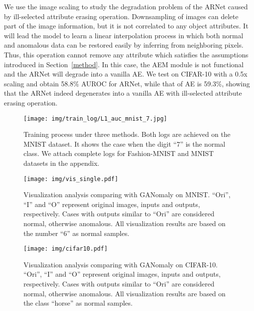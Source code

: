 \documentclass[journal]{IEEEtran}
\begin{document}
We use the image scaling to study the degradation problem of the ARNet caused by ill-selected attribute erasing operation. Downsampling of images can delete part of the image information, but it is not correlated to any object attributes. It will lead the model to learn a linear interpolation process in which both normal and anomalous data can be restored easily by inferring from neighboring pixels. Thus, this operation cannot remove any attribute which satisfies the assumptions introduced in Section~\ref{method}. In this case, the AEM module is not functional and the ARNet will degrade into a vanilla AE. We test on CIFAR-10 with a 0.5x scaling and obtain 58.8\% AUROC for ARNet, while that of AE is 59.3\%, showing that the ARNet indeed degenerates into a vanilla AE with ill-selected attribute erasing operation.

\begin{figure}[t]
\centering
\texttt{[image: img/train\_log/L1\_auc\_mnist\_7.jpg]}
\caption{Training process under three methods. Both logs are achieved on the MNIST dataset. It shows the case when the digit ``7'' is the normal class. We attach complete logs for Fashion-MNIST and MNIST datasets in the appendix.}
\label{fig:stable1}
\end{figure}

\begin{figure}[t]
\centering
\texttt{[image: img/vis\_single.pdf]}
\caption{Visualization analysis comparing with GANomaly on MNIST. ``Ori'', ``I'' and ``O'' represent original images, inputs and outputs, respectively. Cases with outputs similar to ``Ori'' are considered normal, otherwise anomalous. All visualization results are based on the number ``6'' as normal samples.}
\label{img:color}
\end{figure}

\begin{figure}[t]
\centering
\texttt{[image: img/cifar10.pdf]}
\caption{Visualization analysis comparing with GANomaly on CIFAR-10. ``Ori'', ``I'' and ``O'' represent original images, inputs and outputs, respectively. Cases with outputs similar to ``Ori'' are considered normal, otherwise anomalous. All visualization results are based on the class ``horse'' as normal samples.}
\label{img:cifar10_vis}
\end{figure}
\end{document}
